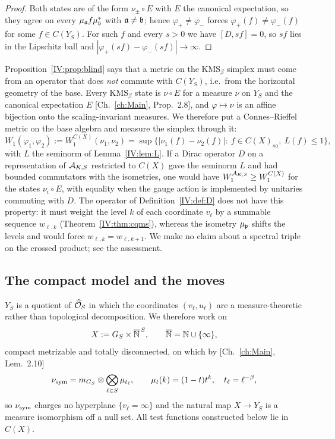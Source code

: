 \begin{proof}
Both states are of the form $\nu_\pm\circ E$ with $E$ the canonical expectation, so they
agree on every $\mu_{\mathfrak{a}} f\mu_{\mathfrak{b}}^*$ with $\mathfrak{a}\ne\mathfrak{b}$; hence $\varphi_+\ne\varphi_-$ forces
$\varphi_+(f)\ne\varphi_-(f)$ for some $f\in C(Y_S)$. For such $f$ and every $s>0$ we have
$[D,sf]=0$, so $sf$ lies in the Lipschitz ball and
$|\varphi_+(sf)-\varphi_-(sf)|\to\infty$.
\end{proof}

\begin{remark}\label{IV:prop:reduction}
Proposition~\ref{IV:prop:blind} says that a metric on the $\mathrm{KMS}_\beta$ simplex must
come from an operator that does \emph{not} commute with $C(Y_S)$, i.e.\ from the horizontal
geometry of the base. Every $\mathrm{KMS}_\beta$ state is $\nu\circ E$ for a measure $\nu$ on
$Y_S$ and the canonical expectation $E$ [Ch.~\ref{ch:Main}, Prop.~2.8], and $\varphi\mapsto\nu$ is an
affine bijection onto the scaling-invariant measures. We therefore put a Connes--Rieffel
metric on the base algebra and measure the simplex through it:
\[
W_1(\varphi_1,\varphi_2):=W_1^{C(X)}(\nu_1,\nu_2)
=\sup\bigl\{|\nu_1(f)-\nu_2(f)|:\ f\in C(X)_{sa},\ L(f)\le1\bigr\},
\]
with $L$ the seminorm of Lemma~\ref{IV:lem:L}. If a Dirac operator $D$ on a representation of
$\mathcal{A}_{K,S}$ restricted to $C(X)$ gave the seminorm $L$ and had bounded commutators with
the isometries, one would have $W_1^{\mathcal{A}_{K,S}}\ge W_1^{C(X)}$ for the states $\nu_i\circ E$,
with equality when the gauge action is implemented by unitaries commuting with $D$. The
operator of Definition~\ref{IV:def:D} does not have this property: it must weight the level
$k$ of each coordinate $v_\ell$ by a summable sequence $w_{\ell,k}$ (Theorem~\ref{IV:thm:cqms}),
whereas the isometry $\mu_{\mathfrak{p}}$ shifts the levels and would force $w_{\ell,k}=w_{\ell,k+1}$.
We make no claim about a spectral triple on the crossed product; see the assessment.
\end{remark}

\subsection{The compact model and the moves}

$Y_S$ is a quotient of $\widehat{\mathcal{O}}_S$ in which the coordinates $(v_\ell,u_\ell)$ are a
measure-theoretic rather than topological decomposition. We therefore work on
\begin{equation}\label{IV:eq:X}
X:=G_S\times\overline{\mathbb{N}}^{\,S},\qquad\overline{\mathbb{N}}=\mathbb{N}\cup\{\infty\},
\end{equation}
compact metrizable and totally disconnected, on which by [Ch.~\ref{ch:Main}, Lem.~2.10]
\begin{equation}\label{IV:eq:nusym}
\nu_{\mathrm{sym}}=m_{G_S}\otimes\bigotimes_{\ell\in S}\mu_{t_\ell},\qquad
\mu_t(k)=(1-t)t^k,\quad t_\ell=\ell^{-\beta},
\end{equation}
so $\nu_{\mathrm{sym}}$ charges no hyperplane $\{v_\ell=\infty\}$ and the natural map $X\to Y_S$ is a
measure isomorphism off a null set. All test functions constructed below lie in $C(X)$.

